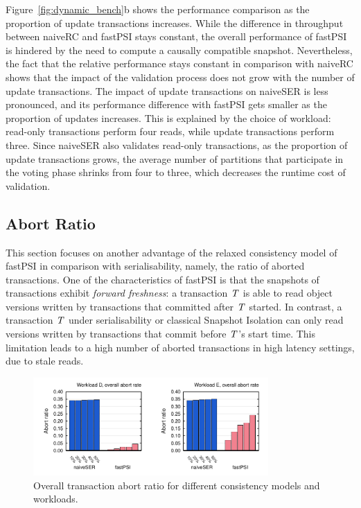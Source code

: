 Figure~\ref{fig:dynamic_bench}b shows the performance comparison as the proportion of update transactions increases. While the difference in throughput between naiveRC and fastPSI stays constant, the overall performance of fastPSI is hindered by the need to compute a causally compatible snapshot. Nevertheless, the fact that the relative performance stays constant in comparison with naiveRC shows that the impact of the validation process does not grow with the number of update transactions. The impact of update transactions on naiveSER is less pronounced, and its performance difference with fastPSI gets smaller as the proportion of updates increases. This is explained by the choice of workload: read-only transactions perform four reads, while update transactions perform three. Since naiveSER also validates read-only transactions, as the proportion of update transactions grows, the average number of partitions that participate in the voting phase shrinks from four to three, which decreases the runtime cost of validation.

\subsection{Abort Ratio}
\label{subsect:abort_ratio}

This section focuses on another advantage of the relaxed consistency model of fastPSI in comparison with serialisability, namely, the ratio of aborted transactions. One of the characteristics of fastPSI is that the snapshots of transactions exhibit \emph{forward freshness}: a transaction $\mathit{T}$ is able to read object versions written by transactions that committed after $\mathit{T}$ started. In contrast, a transaction $\mathit{T}$ under serialisability or classical Snapshot Isolation can only read versions written by transactions that commit before $\mathit{T}$'s start time. This limitation leads to a high number of aborted transactions in high latency settings, due to stale reads.

\begin{figure}[t]
\begin{center}
\includegraphics[width=0.8\textwidth]{figures/abort_rate_bench_overall.pdf}
\vspace{-0.75cm}
\end{center}
\caption{Overall transaction abort ratio for different consistency models and workloads.}
\label{fig:raw_abort_rate_overall}
\end{figure}

